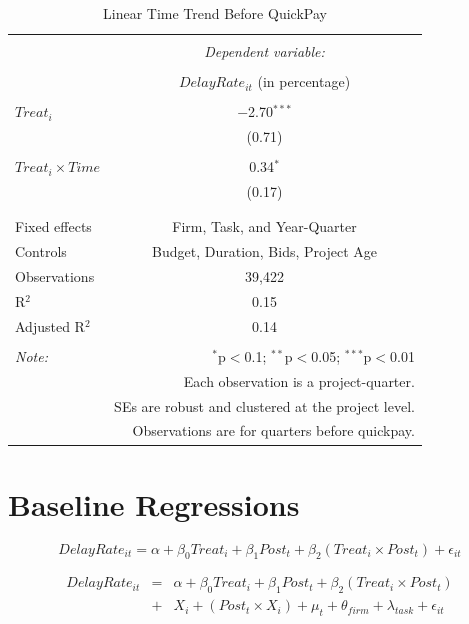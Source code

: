 \documentclass[
]{article}
\begin{document}
\begin{table}[H] \centering 
  \caption{Linear Time Trend Before QuickPay} 
  \label{} 
\small 
\begin{tabular}{@{\extracolsep{5pt}}lc} 
\\[-1.8ex]\hline 
\hline \\[-1.8ex] 
 & \multicolumn{1}{c}{\textit{Dependent variable:}} \\ 
\cline{2-2} 
\\[-1.8ex] & $DelayRate_{it}$ (in percentage) \\ 
\hline \\[-1.8ex] 
 $Treat_i$ & $-$2.70$^{***}$ \\ 
  & (0.71) \\ 
  & \\ 
 $Treat_i \times Time$ & 0.34$^{*}$ \\ 
  & (0.17) \\ 
  & \\ 
\hline \\[-1.8ex] 
Fixed effects & Firm, Task, and Year-Quarter \\ 
Controls & Budget, Duration, Bids, Project Age \\ 
Observations & 39,422 \\ 
R$^{2}$ & 0.15 \\ 
Adjusted R$^{2}$ & 0.14 \\ 
\hline 
\hline \\[-1.8ex] 
\textit{Note:}  & \multicolumn{1}{r}{$^{*}$p$<$0.1; $^{**}$p$<$0.05; $^{***}$p$<$0.01} \\ 
 & \multicolumn{1}{r}{Each observation is a project-quarter.} \\ 
 & \multicolumn{1}{r}{SEs are robust and clustered at the project level.} \\ 
 & \multicolumn{1}{r}{Observations are for quarters before quickpay.} \\ 
\end{tabular} 
\end{table}

\hypertarget{baseline-regressions}{%
\section{Baseline Regressions}\label{baseline-regressions}}

\[ DelayRate_{it} = \alpha+\beta_0 Treat_i + \beta_1 Post_t + \beta_2 (Treat_i \times Post_t) + \epsilon_{it}\]

\[ \begin{aligned} DelayRate_{it} &=& \alpha+\beta_0 Treat_i + \beta_1 Post_t + \beta_2 (Treat_i \times Post_t)\\
&+&  X_i + (Post_t \times X_i) + \mu_t + \theta_{firm} + \lambda_{task}+ \epsilon_{it}
\end{aligned}\]
\end{document}
